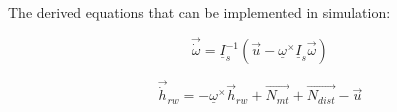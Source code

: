 The derived equations that can be implemented in simulation:

\begin{equation}
\vec{\dot{\omega}} = \underline{I}_{s}^{-1}\left( \vec{u} -  \underline{\omega}^\times\underline{I}_{s}\vec{\omega}  \right) 
\end{equation}

\begin{equation}
\vec{\dot{h}}_{rw} =  -  \underline{\omega}^\times \vec{{h}}_{rw} + \vec{N_{mt}}  + \vec{N_{dist}} - \vec{u} 
\end{equation}





\cite{DesatYang}